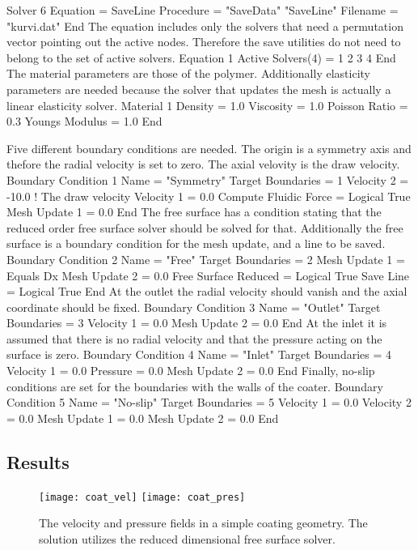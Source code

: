 Solver 6
  Equation = SaveLine
  Procedure = "SaveData" "SaveLine"
  Filename = "kurvi.dat"
End
\ttend
%
The equation includes only the solvers that need a permutation vector 
pointing out the active nodes. Therefore the save utilities do not need to belong
to the set of active solvers.
\ttbegin
Equation 1
  Active Solvers(4) = 1 2 3 4
End
\ttend
%
The material parameters are those of the polymer. Additionally elasticity 
parameters are needed because the solver that updates the mesh is actually
a linear elasticity solver.
\ttbegin
Material 1
  Density = 1.0
  Viscosity = 1.0
  Poisson Ratio = 0.3
  Youngs Modulus = 1.0
End
\ttend

Five different boundary conditions are needed.
The origin is a symmetry axis and thefore the radial velocity is 
set to zero. The axial velovity is the draw velocity.
\ttbegin
Boundary Condition 1
  Name = "Symmetry"
  Target Boundaries = 1
  Velocity 2 = -10.0     ! The draw velocity
  Velocity 1 = 0.0
  Compute Fluidic Force = Logical True
  Mesh Update 1 = 0.0
End
\ttend
%
The free surface has a condition stating that the reduced order free 
surface solver should be solved for that. Additionally the 
free surface is a boundary condition for the mesh update,
and a line to be saved.
\ttbegin
Boundary Condition 2
  Name = "Free"
  Target Boundaries = 2
  Mesh Update 1 = Equals Dx
  Mesh Update 2 = 0.0
  Free Surface Reduced = Logical True
  Save Line = Logical True
End
\ttend
%
At the outlet the radial velocity should vanish and the axial coordinate should
be fixed.
\ttbegin
Boundary Condition 3
  Name = "Outlet"
  Target Boundaries = 3
  Velocity 1 = 0.0
  Mesh Update 2 = 0.0
End
\ttend
%
At the inlet it is assumed that there is no radial velocity and that 
the pressure acting on the surface is zero.
\ttbegin
Boundary Condition 4
  Name = "Inlet"
  Target Boundaries = 4
  Velocity 1 = 0.0
  Pressure = 0.0
  Mesh Update 2 = 0.0
End
\ttend
%
Finally, no-slip conditions are set for the boundaries with the walls of the
coater.
\ttbegin
Boundary Condition 5
  Name = "No-slip"
  Target Boundaries = 5
  Velocity 1 = 0.0
  Velocity 2 = 0.0
  Mesh Update 1 = 0.0
  Mesh Update 2 = 0.0
End
\ttend


\subsection*{Results}

\begin{figure}[tbhp]
\begin{center}
  \texttt{[image: coat\_vel]}
  \texttt{[image: coat\_pres]}
  \caption{The velocity and pressure fields in a simple coating geometry.
	The solution utilizes the reduced dimensional free surface solver.}
\end{center}
\end{figure}

